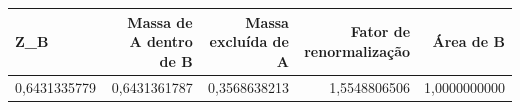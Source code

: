 \begin{tabular}{lrrrr}
\toprule
Z\_B & Massa de A dentro de B & Massa excluída de A & Fator de renormalização & Área de B \\
\midrule
0,6431335779 & 0,6431361787 & 0,3568638213 & 1,5548806506 & 1,0000000000 \\
\bottomrule
\end{tabular}
